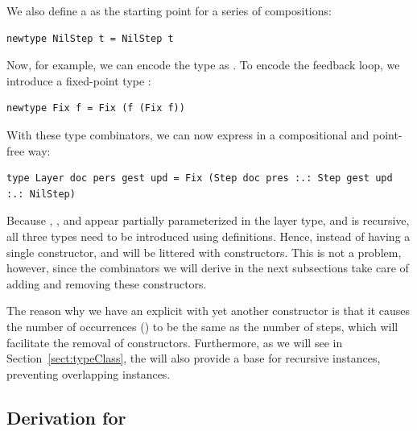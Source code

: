 \documentclass{llncs}
\begin{document}
We also define a  as the starting point for a series of compositions:

\begin{small}
\begin{verbatim}
newtype NilStep t = NilStep t
\end{verbatim}
\end{small}

Now, for example, we can encode the type  as
. To encode the feedback loop, we introduce a fixed-point type :

\begin{small}
\begin{verbatim}
newtype Fix f = Fix (f (Fix f))
\end{verbatim}
\end{small}

With these type combinators, we can now express  in a compositional and point-free way:

\begin{small}
\begin{verbatim}
type Layer doc pers gest upd = Fix (Step doc pres :.: Step gest upd :.: NilStep)
\end{verbatim}
\end{small}

Because , , and   appear partially parameterized in the layer type, and  is recursive, all three types need to be introduced using  definitions. Hence, instead of having a single  constructor,  and  will be littered with constructors. This is not a problem, however, since the combinators we will derive in the next subsections take care of adding and removing these constructors.

The reason why we have an explicit  with yet another constructor is that it causes the number of occurrences () to be the same as the number of steps, which will facilitate the removal of  constructors. Furthermore, as we will see in Section~\ref{sect:typeClass}, the  will also provide a base for recursive instances, preventing overlapping instances.


%																
\subsection{Derivation for }\label{subsect:liftDerivation}
\end{document}
